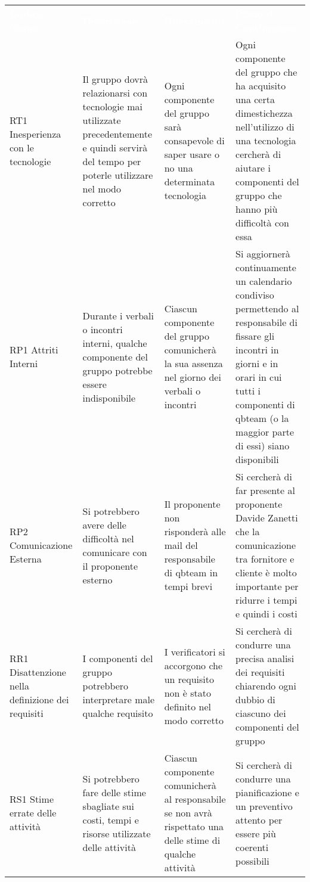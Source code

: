 {
\renewcommand{\arraystretch}{2}
\centering
\begin{longtable}{ C{2cm} C{4.5cm} C{4.5cm} C{4.5cm}}
\textcolor{white}{\textbf{Codice Nome}} & \textcolor{white}{\textbf{Descrizione}} & \textcolor{white}{\textbf{Rilevamento}} &  \textcolor{white}{\textbf{Piano di Contingenza}}\\	

RT1 Inesperienza con le tecnologie & Il gruppo dovrà relazionarsi con tecnologie mai utilizzate precedentemente e quindi servirà del tempo per poterle utilizzare nel modo corretto & Ogni componente del gruppo sarà consapevole di saper usare o no una determinata tecnologia & Ogni componente del gruppo che ha acquisito una certa dimestichezza nell'utilizzo di una tecnologia cercherà di aiutare i componenti del gruppo che hanno più difficoltà con essa \\

RP1 Attriti Interni & Durante i verbali o incontri interni, qualche componente del gruppo potrebbe essere indisponibile & Ciascun componente del gruppo comunicherà la sua assenza nel giorno dei verbali o incontri & Si aggiornerà continuamente un calendario condiviso permettendo al responsabile di fissare gli incontri in giorni e in orari in cui tutti i componenti di qbteam (o la maggior parte di essi) siano disponibili \\ 

RP2 Comunicazione Esterna & Si potrebbero avere delle difficoltà nel comunicare con il proponente esterno & Il proponente non risponderà alle mail del responsabile di qbteam in tempi brevi & Si cercherà di far presente al proponente Davide Zanetti che la comunicazione tra fornitore e cliente è molto importante per ridurre i tempi e quindi i costi \\

RR1 Disattenzione nella definizione dei requisiti & I componenti del gruppo potrebbero interpretare male qualche requisito & I verificatori si accorgono che un requisito non è stato definito nel modo corretto & Si cercherà di condurre una precisa analisi dei requisiti chiarendo ogni dubbio di ciascuno dei componenti del gruppo \\

RS1 Stime errate delle attività & Si potrebbero fare delle stime sbagliate sui costi, tempi e risorse utilizzate delle attività & Ciascun componente comunicherà al responsabile se non avrà rispettato una delle stime di qualche attività & Si cercherà di condurre una pianificazione e un preventivo attento per essere più coerenti possibili \\


\end{longtable}}
